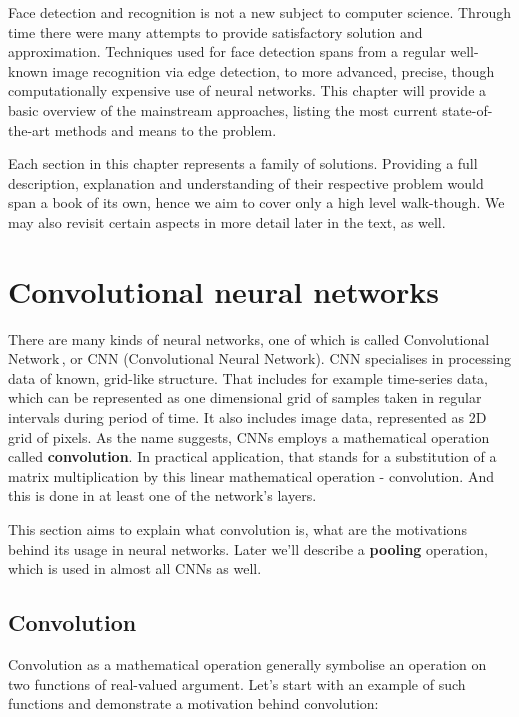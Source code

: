 Face detection and recognition is not a new subject to computer science. Through time there were many attempts to provide satisfactory solution and approximation. Techniques used for face detection spans from a regular well-known image recognition via edge detection, to more advanced, precise, though computationally expensive use of neural networks. This chapter will provide a basic overview of the mainstream approaches, listing the most current state-of-the-art methods and means to the problem.

Each section in this chapter represents a family of solutions. Providing a full description, explanation and understanding of their respective problem would span a book of its own, hence we aim to cover only a high level walk-though. We may also revisit certain aspects in more detail later in the text, as well.

\section{Convolutional neural networks}

There are many kinds of neural networks, one of which is called Convolutional Network\,\cite[p.~330]{deeplearningbook}, or CNN (Convolutional Neural Network). CNN specialises in processing data of known, grid-like structure. That includes for example time-series data, which can be represented as one dimensional grid of samples taken in regular intervals during period of time. It also includes image data, represented as 2D grid of pixels. As the name suggests, CNNs employs a mathematical operation called \textbf{convolution}. In practical application, that stands for a substitution of a matrix multiplication by this linear mathematical operation - convolution. And this is done in at least one of the network's layers.

This section aims to explain what convolution is, what are the motivations behind its usage in neural networks. Later we'll describe a \textbf{pooling} operation, which is used in almost all CNNs as well.

\subsection{Convolution}

Convolution as a mathematical operation generally symbolise an operation on two functions of real-valued argument. Let's start with an example of such functions and demonstrate a motivation behind convolution:

